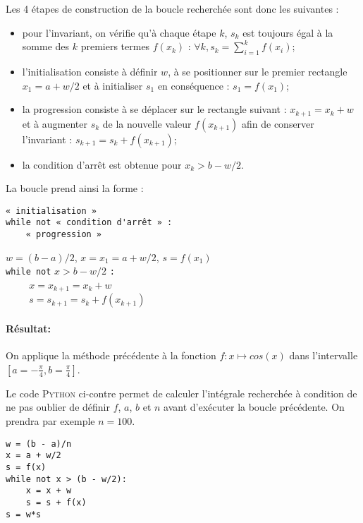 \documentclass[11pt,a4paper,colorlinks,breaklinks]{article}
\def\python{\textsc{Python}}
\begin{document}
Les 4 étapes de construction de la boucle recherchée sont donc les suivantes :
\begin{itemize}
\item pour l'invariant, on vérifie qu'à chaque étape $k$, $s_k$ est toujours égal à la somme 
	des $k$ premiers termes $f(x_k)$ : 
	$\displaystyle \forall k, s_k = \sum_{i=1}^k f(x_i)$;
\item l'initialisation consiste à définir $w$, à se positionner sur le premier rectangle 
	$x_1 = a + w/2$ et à initialiser $s_1$ en conséquence : $s_1 = f(x_1)$;
\item la progression consiste à se déplacer sur le rectangle suivant : $x_{k+1} = x_{k} + w$
	et à augmenter $s_k$ de la nouvelle valeur $f(x_{k+1})$ afin de conserver l'invariant :
	$s_{k+1} = s_k + f(x_{k+1})$;
\item la condition d'arrêt est obtenue pour $x_k > b - w/2$.
\end{itemize}
\vspace*{3mm}

\noindent La boucle prend ainsi la forme :\\
\begin{minipage}[t]{8cm}
\begin{Verbatim}
« initialisation »
while not « condition d'arrêt » :
    « progression »
\end{Verbatim}
\end{minipage}
\hfill
\begin{minipage}[t]{7cm}\footnotesize
$w = (b-a)/2$, $x = x_1 = a + w/2$, $s = f(x_1)$\\
\texttt{while not} $x > b-w/2$ \texttt{:}\\
\mbox{}\texttt{\ \ \ \ } $x = x_{k+1} = x_{k} + w$\\
\mbox{}\texttt{\ \ \ \ } $s = s_{k+1} = s_k + f(x_{k+1})$\\
\end{minipage}

\paragraph{Résultat:} On applique la méthode précédente à la fonction $f : x \mapsto cos(x)$
dans l'intervalle $\displaystyle [a=-\frac{\pi}{4},b=\frac{\pi}{4}]$.

\noindent\begin{minipage}{7cm}
Le code \python{} ci-contre permet de calculer l'intégrale recherchée
à condition de ne pas oublier de définir $f$, $a$, $b$ et $n$
avant d'exécuter la boucle précédente. On prendra par exemple $n = 100$.
\end{minipage}
\hfill
\begin{minipage}{8cm}\footnotesize
\begin{lstlisting}[caption=\textbf{intégration numérique}]
w = (b - a)/n
x = a + w/2
s = f(x)
while not x > (b - w/2):
    x = x + w
    s = s + f(x)
s = w*s
\end{lstlisting}
\end{minipage}
\end{document}
